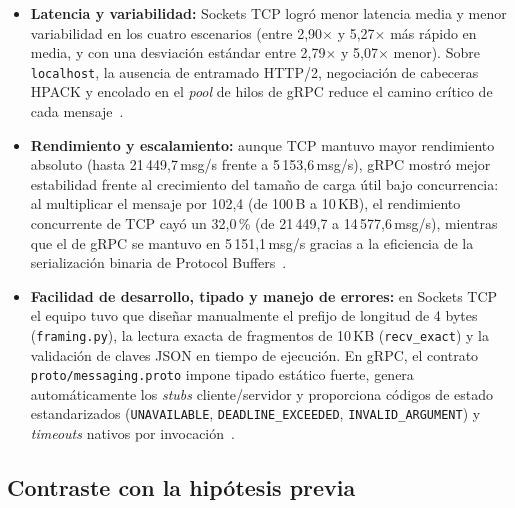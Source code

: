 \documentclass[12pt,a4paper]{article}
\begin{document}
\begin{itemize}
  \item \textbf{Latencia y variabilidad:} Sockets TCP logró menor latencia media y menor variabilidad en los cuatro escenarios (entre 2,90$\times$ y 5,27$\times$ más rápido en media, y con una desviación estándar entre 2,79$\times$ y 5,07$\times$ menor). Sobre \texttt{localhost}, la ausencia de entramado HTTP/2, negociación de cabeceras HPACK y encolado en el \emph{pool} de hilos de gRPC reduce el camino crítico de cada mensaje~\cite{liu2022session,ciftci2025review}.
  \item \textbf{Rendimiento y escalamiento:} aunque TCP mantuvo mayor rendimiento absoluto (hasta 21\,449,7\,msg/s frente a 5\,153,6\,msg/s), gRPC mostró mejor estabilidad frente al crecimiento del tamaño de carga útil bajo concurrencia: al multiplicar el mensaje por 102,4 (de 100\,B a 10\,KB), el rendimiento concurrente de TCP cayó un 32,0\,\% (de 21\,449,7 a 14\,577,6\,msg/s), mientras que el de gRPC se mantuvo en 5\,151,1\,msg/s gracias a la eficiencia de la serialización binaria de Protocol Buffers~\cite{jackson2024streaming,mehdi2026crosslanguage}.
  \item \textbf{Facilidad de desarrollo, tipado y manejo de errores:} en Sockets TCP el equipo tuvo que diseñar manualmente el prefijo de longitud de 4 bytes (\texttt{framing.py}), la lectura exacta de fragmentos de 10\,KB (\texttt{recv\_exact}) y la validación de claves JSON en tiempo de ejecución. En gRPC, el contrato \texttt{proto/messaging.proto} impone tipado estático fuerte, genera automáticamente los \emph{stubs} cliente/servidor y proporciona códigos de estado estandarizados (\texttt{UNAVAILABLE}, \texttt{DEADLINE\_EXCEEDED}, \texttt{INVALID\_ARGUMENT}) y \emph{timeouts} nativos por invocación~\cite{niswar2024performance,zhu2025rethinking}.
\end{itemize}

\subsection{Contraste con la hipótesis previa}
\end{document}
